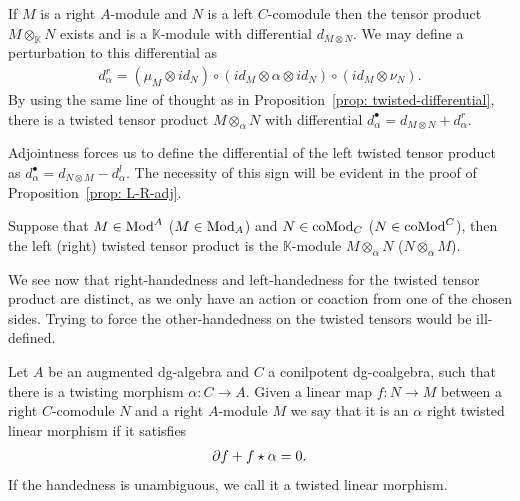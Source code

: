 \documentclass[../thesis.tex]{subfiles}
\begin{document}
            If $M$ is a right $A$-module and $N$ is a left $C$-comodule then the tensor product $M\otimes_\mathbb{K} N$ exists and is a $\mathbb{K}$-module with differential $d_{M\otimes N}$. We may define a perturbation to this differential as 
            \begin{align*}
                d_\alpha^r = (\mu_M\otimes id_N) \circ (id_M \otimes \alpha \otimes id_N) \circ (id_M \otimes \nu_N).
            \end{align*}
            By using the same line of thought as in Proposition~\ref{prop: twisted-differential}, there is a twisted tensor product $M\otimes_\alpha N$ with differential $d_\alpha^\bullet = d_{M\otimes N} + d_\alpha^r$.

            \begin{remark}
                Adjointness forces us to define the differential of the left twisted tensor product as $d_\alpha^\bullet = d_{N\otimes M} - d_\alpha^l$. The necessity of this sign will be evident in the proof of Proposition~\ref{prop: L-R-adj}. 
            \end{remark}
            
            \begin{definition}
                Suppose that $M\in \tt{Mod}^A$ ($M\in \tt{Mod}_A$) and $N\in \tt{coMod}_C$ ($N\in \tt{coMod}^C$), then the left (right) twisted tensor product is the $\mathbb{K}$-module $M\otimes_\alpha N$ ($N\otimes_\alpha M$).
            \end{definition}

            We see now that right-handedness and left-handedness for the twisted tensor product are distinct, as we only have an action or coaction from one of the chosen sides. Trying to force the other-handedness on the twisted tensors would be ill-defined.

            \begin{definition}
                Let $A$ be an augmented dg-algebra and $C$ a conilpotent dg-coalgebra, such that there is a twisting morphism $\alpha: C\rightarrow A$. Given a linear map $f: N \rightarrow M$ between a right $C$-comodule $N$ and a right $A$-module $M$ we say that it is an $\alpha$ right twisted linear morphism if it satisfies
                \begin{align*}
                    \partial f + f\star \alpha = 0\tt{.}
                \end{align*}
                If the handedness is unambiguous, we call it a twisted linear morphism.
            \end{definition}
\end{document}
